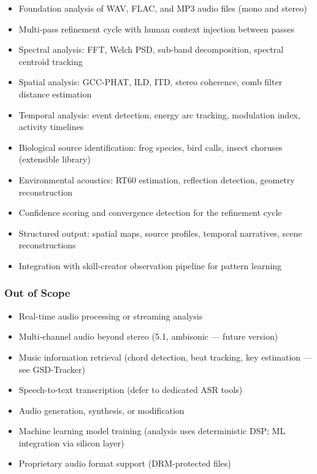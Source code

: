 \documentclass[11pt,letterpaper]{article}
\begin{document}
\begin{itemize}[leftmargin=2em]
\item Foundation analysis of WAV, FLAC, and MP3 audio files (mono and stereo)
\item Multi-pass refinement cycle with human context injection between passes
\item Spectral analysis: FFT, Welch PSD, sub-band decomposition, spectral centroid tracking
\item Spatial analysis: GCC-PHAT, ILD, ITD, stereo coherence, comb filter distance estimation
\item Temporal analysis: event detection, energy arc tracking, modulation index, activity timelines
\item Biological source identification: frog species, bird calls, insect choruses (extensible library)
\item Environmental acoustics: RT60 estimation, reflection detection, geometry reconstruction
\item Confidence scoring and convergence detection for the refinement cycle
\item Structured output: spatial maps, source profiles, temporal narratives, scene reconstructions
\item Integration with skill-creator observation pipeline for pattern learning
\end{itemize}

\subsubsection{Out of Scope}

\begin{itemize}[leftmargin=2em]
\item Real-time audio processing or streaming analysis
\item Multi-channel audio beyond stereo (5.1, ambisonic --- future version)
\item Music information retrieval (chord detection, beat tracking, key estimation --- see GSD-Tracker)
\item Speech-to-text transcription (defer to dedicated ASR tools)
\item Audio generation, synthesis, or modification
\item Machine learning model training (analysis uses deterministic DSP; ML integration via silicon layer)
\item Proprietary audio format support (DRM-protected files)
\end{itemize}
\end{document}

